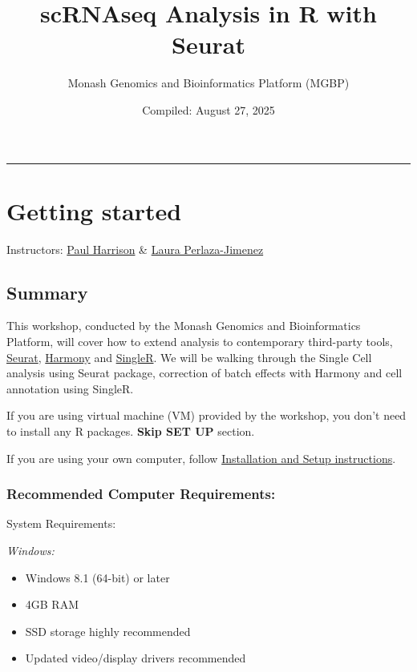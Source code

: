 \documentclass[
]{book}
\title{scRNAseq Analysis in R with Seurat}
\author{Monash Genomics and Bioinformatics Platform (MGBP)}
\date{Compiled: August 27, 2025}
\providecommand{\tightlist}{%
  \setlength{\itemsep}{0pt}\setlength{\parskip}{0pt}}
\begin{document}
\maketitle

{
\setcounter{tocdepth}{1}
\tableofcontents
}
\begin{center}\rule{0.5\linewidth}{0.5pt}\end{center}

\chapter{Getting started}\label{getting-started}

Instructors: \href{https://www.monash.edu/researchinfrastructure/bioinformatics/about/people}{Paul Harrison} \& \href{https://www.monash.edu/researchinfrastructure/bioinformatics/about/people}{Laura Perlaza-Jimenez}

\section{Summary}\label{summary}

This workshop, conducted by the Monash Genomics and Bioinformatics Platform, will cover how to extend analysis to contemporary third-party tools, \href{https://satijalab.org/seurat/}{Seurat}, \href{https://github.com/immunogenomics/harmony}{Harmony} and \href{https://bioconductor.org/packages/release/bioc/html/SingleR.html}{SingleR}. We will be walking through the Single Cell analysis using Seurat package, correction of batch effects with Harmony and cell annotation using SingleR.

If you are using virtual machine (VM) provided by the workshop, you don't need to install any R packages. \textbf{Skip SET UP} section.

If you are using your own computer, follow \href{set-up.html}{Installation and Setup instructions}.

\subsection{Recommended Computer Requirements:}\label{recommended-computer-requirements}

System Requirements:

\emph{Windows:}

\begin{itemize}
\tightlist
\item
  Windows 8.1 (64-bit) or later
\item
  4GB RAM
\item
  SSD storage highly recommended
\item
  Updated video/display drivers recommended
\end{itemize}
\end{document}
